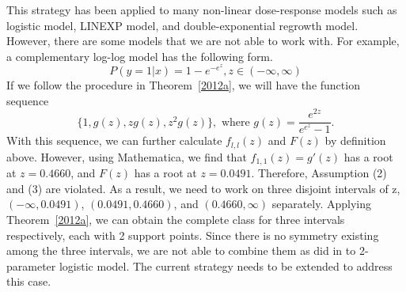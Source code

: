 \documentclass[11pt]{amsart}
\newtheorem{theorem}{Theorem}[section]
\theoremstyle{definition}
\theoremstyle{remark}
\numberwithin{equation}{section}
\begin{document}


 This strategy has been applied to many non-linear dose-response models such as logistic model, LINEXP model, and double-exponential regrowth model. However, there are some models that we are not able to work with. For example, a complementary log-log model has the following form. \[P(y=1|x) = 1-e^{-e^{z}}, z\in(-\infty,\infty)\] If we follow the procedure in Theorem~\ref{2012a}, we will have the function sequence \[\{1,g(z), zg(z),z^2g(z)\},\text{ where }g(z)=\frac{e^{2z}}{e^{e^z}-1}.\] With this sequence, we can further calculate $f_{l,l}(z)$ and $F(z)$ by definition above. However, using Mathematica, we find that $f_{1,1}(z) = g'(z)$ has a root at $z=0.4660$, and $F(z)$ has a root at $z=0.0491$. Therefore, Assumption (2) and (3) are violated. As a result, we need to work on three disjoint intervals of z, $(-\infty, 0.0491)$, $(0.0491, 0.4660)$, and $(0.4660,\infty)$ separately. Applying Theorem~\ref{2012a}, we can obtain the complete class for three intervals respectively, each with 2 support points. Since there is no symmetry existing among the three intervals, we are not able to combine them as did in \cite{yang2009} to 2-parameter logistic model. The current strategy needs to be extended to address this case.
\end{document}
